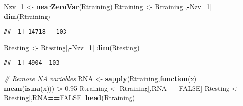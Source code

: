 \documentclass[]{article}
\newenvironment{Shaded}{\begin{snugshade}}{\end{snugshade}}
\newcommand{\CommentTok}[1]{\textcolor[rgb]{0.56,0.35,0.01}{\textit{#1}}}
\newcommand{\ControlFlowTok}[1]{\textcolor[rgb]{0.13,0.29,0.53}{\textbf{#1}}}
\newcommand{\DecValTok}[1]{\textcolor[rgb]{0.00,0.00,0.81}{#1}}
\newcommand{\FloatTok}[1]{\textcolor[rgb]{0.00,0.00,0.81}{#1}}
\newcommand{\KeywordTok}[1]{\textcolor[rgb]{0.13,0.29,0.53}{\textbf{#1}}}
\newcommand{\NormalTok}[1]{#1}
\newcommand{\OperatorTok}[1]{\textcolor[rgb]{0.81,0.36,0.00}{\textbf{#1}}}
\newcommand{\OtherTok}[1]{\textcolor[rgb]{0.56,0.35,0.01}{#1}}
\newcommand{\StringTok}[1]{\textcolor[rgb]{0.31,0.60,0.02}{#1}}
\begin{document}
\begin{Shaded}
\begin{Highlighting}[]
\NormalTok{Nzv_}\DecValTok{1}\NormalTok{ <-}\StringTok{ }\KeywordTok{nearZeroVar}\NormalTok{(Rtraining)}
\NormalTok{Rtraining <-}\StringTok{ }\NormalTok{Rtraining[,}\OperatorTok{-}\NormalTok{Nzv_}\DecValTok{1}\NormalTok{]}
\KeywordTok{dim}\NormalTok{(Rtraining)}
\end{Highlighting}
\end{Shaded}

\begin{verbatim}
## [1] 14718   103
\end{verbatim}

\begin{Shaded}
\begin{Highlighting}[]
\NormalTok{Rtesting <-}\StringTok{ }\NormalTok{Rtesting[,}\OperatorTok{-}\NormalTok{Nzv_}\DecValTok{1}\NormalTok{]}
\KeywordTok{dim}\NormalTok{(Rtesting)}
\end{Highlighting}
\end{Shaded}

\begin{verbatim}
## [1] 4904  103
\end{verbatim}

\begin{Shaded}
\begin{Highlighting}[]
\CommentTok{# Remove NA variables}
\NormalTok{RNA <-}\StringTok{ }\KeywordTok{sapply}\NormalTok{(Rtraining,}\ControlFlowTok{function}\NormalTok{(x) }\KeywordTok{mean}\NormalTok{(}\KeywordTok{is.na}\NormalTok{(x))) }\OperatorTok{>}\StringTok{ }\FloatTok{0.95}
\NormalTok{Rtraining <-}\StringTok{ }\NormalTok{Rtraining[,RNA}\OperatorTok{==}\OtherTok{FALSE}\NormalTok{]}
\NormalTok{Rtesting <-}\StringTok{ }\NormalTok{Rtesting[,RNA}\OperatorTok{==}\OtherTok{FALSE}\NormalTok{]}
\KeywordTok{head}\NormalTok{(Rtraining)}
\end{Highlighting}
\end{Shaded}
\end{document}
